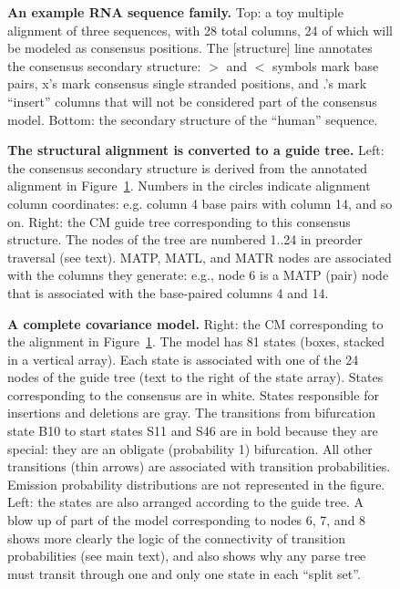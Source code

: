 \documentclass[11pt]{article}
\begin{document}
\newpage
\begin{figure}[h]
\caption{\textbf{An example RNA sequence family.} Top: a toy multiple
alignment of three sequences, with 28 total columns, 24 of which will
be modeled as consensus positions. The [structure] line annotates the
consensus secondary structure: $>$ and $<$ symbols mark base pairs,
x's mark consensus single stranded positions, and .'s mark
``insert'' columns that will not be considered part of the consensus
model. Bottom: the secondary structure of the ``human'' sequence.} 
\label{fig:input_alignment}
\end{figure}

\begin{figure}[h]
\caption{\textbf{The structural alignment is converted to a guide
tree.} Left: the consensus secondary structure is derived from the
annotated alignment in Figure~\ref{fig:input_alignment}. Numbers in
the circles indicate alignment column coordinates: e.g.  column 4 base
pairs with column 14, and so on. Right: the CM guide tree
corresponding to this consensus structure. The nodes of the tree are
numbered 1..24 in preorder traversal (see text). MATP, MATL, and MATR
nodes are associated with the columns they generate: e.g., node 6 is a
MATP (pair) node that is associated with the base-paired columns 4 and
14.}
\label{fig:cm_nodetree}
\end{figure}

\begin{figure}[h]
\caption{\textbf{A complete covariance model.} Right: the CM
corresponding to the alignment in Figure~\ref{fig:input_alignment}.
The model has 81 states (boxes, stacked in a vertical array). Each
state is associated with one of the 24 nodes of the guide tree (text
to the right of the state array). States corresponding to the
consensus are in white. States responsible for insertions and
deletions are gray. The transitions from bifurcation state B10 to
start states S11 and S46 are in bold because they are special: they
are an obligate (probability 1) bifurcation. All other transitions
(thin arrows) are associated with transition probabilities.  Emission
probability distributions are not represented in the figure. Left: the
states are also arranged according to the guide tree. A blow up of
part of the model corresponding to nodes 6, 7, and 8 shows
more clearly the logic of the connectivity of transition probabilities
(see main text), and also shows why any parse tree must transit through
one and only one state in each ``split set''.}
\label{fig:cm_graph}
\end{figure}
\end{document}

